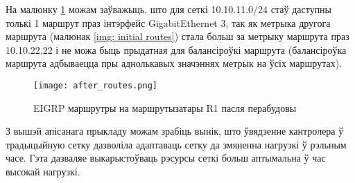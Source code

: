 На малюнку \ref{img: after routes} можам заўважыць, што для сеткі 10.10.11.0/24 стаў даступны толькі
1 маршрут праз інтэрфейс GigabitEthernet 3, так як метрыка другога маршрута (малюнак \ref{img: initial routes}) стала больш за метрыку маршрута праз 10.10.22.22 і не можа быць прыдатная для балансіроўкі маршрута (балансіроўка маршрута адбываецца пры аднолькавых значэннях метрык на ўсіх маршрутах).

\begin{figure}[h!]
    \centering
    \texttt{[image: after\_routes.png]}
    \caption{EIGRP маршрутры на маршрутызатары R1 пасля перабудовы}
    \label{img: after routes} 
\end{figure}

З вышэй апісанага прыкладу можам зрабіць вынік, што ўвядзенне кантролера ў традыцыйную сетку дазволіла
адаптаваць сетку да змяненна нагрузкі ў рэльным часе. Гэта дазваляе выкарыстоўваць рэсурсы сеткі больш аптымальна ў час высокай нагрузкі.
